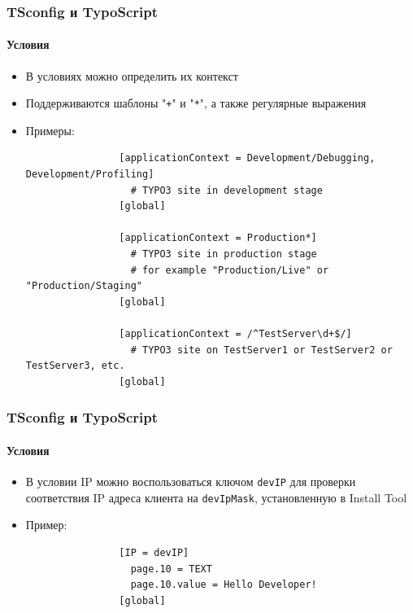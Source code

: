 \begin{frame}[fragile]
	\frametitle{TSconfig и TypoScript}
	\framesubtitle{Условия}

	\begin{itemize}
		\item В условиях можно определить их контекст
		\item Поддерживаются шаблоны "\texttt{+}" и "\texttt{*}", а также регулярные выражения
		\item Примеры:

			\lstset{
				basicstyle=\tiny\ttfamily
			}

			\begin{lstlisting}
				[applicationContext = Development/Debugging, Development/Profiling]
				  # TYPO3 site in development stage
				[global]

				[applicationContext = Production*]
				  # TYPO3 site in production stage
				  # for example "Production/Live" or "Production/Staging"
				[global]

				[applicationContext = /^TestServer\d+$/]
				  # TYPO3 site on TestServer1 or TestServer2 or TestServer3, etc.
				[global]
			\end{lstlisting}

	\end{itemize}

\end{frame}


\begin{frame}[fragile]
	\frametitle{TSconfig и TypoScript}
	\framesubtitle{Условия}

	\begin{itemize}

		\item В условии IP можно воспользоваться ключом \texttt{devIP} для проверки соответствия IP адреса клиента на
		\texttt{devIpMask}, установленную в Install Tool
		\item Пример:


			\begin{lstlisting}
				[IP = devIP]
				  page.10 = TEXT
				  page.10.value = Hello Developer!
				[global]
			\end{lstlisting}

	\end{itemize}

\end{frame}

